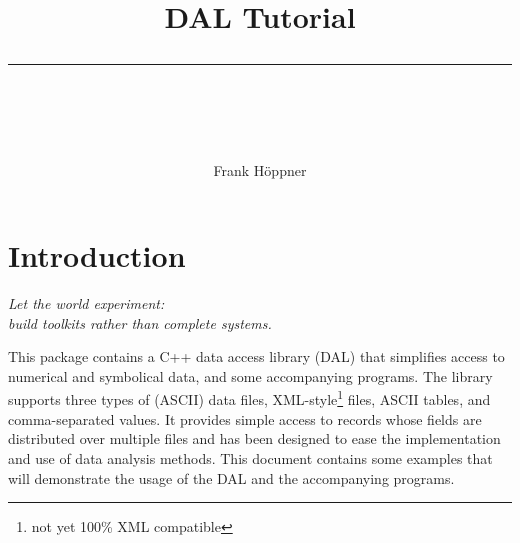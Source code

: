 \documentclass[a4paper]{book}
\begin{document}
\thispagestyle{empty}
\title{DAL Tutorial\\[-3mm]
\rule{12cm}{1mm}\\[1cm]}
\author{Frank H\"oppner}
\maketitle

\clearemptydoublepage
{}
\tableofcontents
\clearemptydoublepage
{}

\chapter{Introduction}

\begin{flushright}\sl 
Let the world experiment:\\
build toolkits rather than complete systems.%
\end{flushright}

This package contains a C++ data access library (DAL) that simplifies
access to numerical and symbolical data, and some accompanying
programs. The library supports three types of (ASCII) data files,
XML-style\footnote{not yet 100\% XML compatible} files, ASCII tables,
and comma-separated values.  It provides simple access to records
whose fields are distributed over multiple files and has been designed
to ease the implementation and use of data analysis methods. This
document contains some examples that will demonstrate the usage of the
DAL and the accompanying programs.
\end{document}
